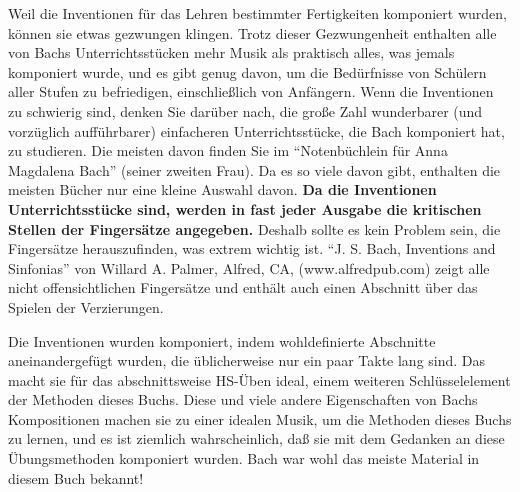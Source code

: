 Weil die Inventionen für das Lehren bestimmter Fertigkeiten komponiert wurden, können sie etwas gezwungen klingen. 
Trotz dieser Gezwungenheit enthalten alle von Bachs Unterrichtsstücken mehr Musik als praktisch alles, was jemals komponiert wurde, und es gibt genug davon, um die Bedürfnisse von Schülern aller Stufen zu befriedigen, einschließlich von Anfängern.
Wenn die Inventionen zu schwierig sind, denken Sie darüber nach, die große Zahl wunderbarer (und vorzüglich aufführbarer) einfacheren Unterrichtsstücke, die Bach komponiert hat, zu studieren.
Die meisten davon finden Sie im \enquote{Notenbüchlein für Anna Magdalena Bach} (seiner zweiten Frau).
Da es so viele davon gibt, enthalten die meisten Bücher nur eine kleine Auswahl davon.
\textbf{Da die Inventionen Unterrichtsstücke sind, werden in fast jeder Ausgabe die kritischen Stellen der Fingersätze angegeben.}
Deshalb sollte es kein Problem sein, die Fingersätze herauszufinden, was extrem wichtig ist.
\enquote{J. S. Bach, Inventions and Sinfonias} von Willard A. Palmer, Alfred, CA, (www.alfredpub.com) zeigt alle nicht offensichtlichen Fingersätze und enthält auch einen Abschnitt über das Spielen der Verzierungen.

Die Inventionen wurden komponiert, indem wohldefinierte Abschnitte aneinandergefügt wurden, die üblicherweise nur ein paar Takte lang sind.
Das macht sie für das abschnittsweise HS-Üben ideal, einem weiteren Schlüsselelement der Methoden dieses Buchs.
Diese und viele andere Eigenschaften von Bachs Kompositionen machen sie zu einer idealen Musik, um die Methoden dieses Buchs zu lernen, und es ist ziemlich wahrscheinlich, daß sie mit dem Gedanken an diese Übungsmethoden komponiert wurden.
Bach war wohl das meiste Material in diesem Buch bekannt!

